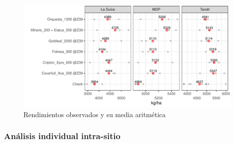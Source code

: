 \documentclass[
  letterpaper,
  DIV=11,
  numbers=noendperiod]{scrreprt}
\begin{document}
\begin{figure}

{\centering \includegraphics{./foliares_files/figure-pdf/unnamed-chunk-24-1.pdf}

}

\caption{Rendimientos observados y su media aritmética}

\end{figure}

\hypertarget{anuxe1lisis-individual-intra-sitio-2}{%
\subsubsection*{Análisis individual
intra-sitio}\label{anuxe1lisis-individual-intra-sitio-2}}

 
  \providecommand{\huxb}[2]{\arrayrulecolor[RGB]{#1}\global\arrayrulewidth=#2pt}
  \providecommand{\huxvb}[2]{\color[RGB]{#1}\vrule width #2pt}
  \providecommand{\huxtpad}[1]{\rule{0pt}{#1}}
  \providecommand{\huxbpad}[1]{\rule[-#1]{0pt}{#1}}
\end{document}
